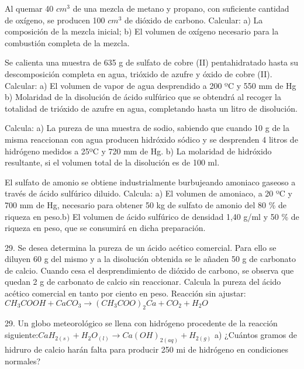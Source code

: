\begin{multicols}{2}
\begin{problem}
\end{problem}
\begin{problem}
Al quemar 40 $cm^3$ de una mezcla de metano y propano, con suficiente cantidad de oxígeno, se producen 100 $cm^3$ de dióxido de carbono. Calcular: a) La composición de la mezcla inicial; b) El volumen de oxígeno necesario para la combustión completa de la mezcla.	
\end{problem}
\begin{problem}
Se calienta una muestra de 635 g de sulfato de cobre (II) pentahidratado hasta su descomposición completa en agua, trióxido de azufre y óxido de cobre (II). Calcular: a) El volumen de vapor de agua desprendido a 200 ºC y 550 mm de Hg b)	Molaridad de la disolución de ácido sulfúrico que se obtendrá al recoger la totalidad de trióxido de azufre en agua, completando hasta un litro de disolución.
\end{problem}
\begin{problem}
Calcula: a) La pureza de una muestra de sodio, sabiendo que cuando 10 g de la misma reaccionan con agua producen hidróxido sódico y se desprenden 4 litros de hidrógeno medidos a 25ºC y 720 mm de Hg. b) La molaridad de hidróxido resultante, si el volumen total de la disolución es de 100 ml.
\end{problem}
\begin{problem}
El sulfato de amonio se obtiene industrialmente burbujeando amoniaco gaseoso a través de ácido sulfúrico diluido. Calcula: a)	El volumen de amoniaco, a 20 ºC y 700 mm de Hg, necesario para obtener 50 kg de sulfato de amonio del 80 \% de riqueza en peso.b) El volumen de ácido sulfúrico de densidad 1,40 g/ml y 50 \% de riqueza en peso, que se consumirá en dicha preparación.
\end{problem}
\begin{problem}
29.	Se desea determina la pureza de un ácido acético comercial. Para ello se diluyen 60 g del mismo y a la disolución obtenida se le añaden 50 g de carbonato de calcio. Cuando cesa el desprendimiento de dióxido de carbono, se observa que quedan 2 g de carbonato de calcio sin reaccionar. Calcula la pureza del ácido acético comercial en tanto por ciento en peso. Reacción sin ajustar: $CH_3COOH + CaCO_3 \longrightarrow (CH_3COO)_2Ca + CO_2 + H_2O$	
\end{problem}
\begin{problem}
	29.	Un globo meteorológico se llena con hidrógeno procedente de la reacción siguiente:$CaH_{2(s)} + H_2O_{(l)} \longrightarrow Ca(OH)_{2(aq)} + H_{2(g)}$
a)	¿Cuántos gramos de hidruro de calcio harán falta para producir 250 mi de hidrógeno en condiciones normales?

\end{problem}
\end{multicols}

